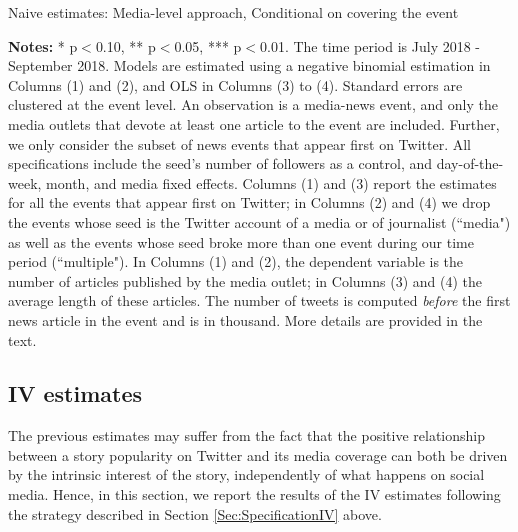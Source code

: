 \begin{table}
\caption{Naive estimates: Media-level approach, Conditional on covering the event}
\begin{center}
	
\end{center}
\begin{spacing}{0.5}
	{\fns \textbf{Notes:} * p$<$0.10, ** p$<$0.05, *** p$<$0.01. The time period is July 2018 - September 2018.  Models are estimated using a negative binomial estimation in Columns (1) and (2), and OLS in Columns (3) to (4). Standard errors are clustered at the event level. An observation is a media-news event, and only the media outlets that devote at least one article to the event are included. Further, we only consider the subset of news events that appear first on Twitter. All specifications include the seed's number of followers as a control, and day-of-the-week, month, and media fixed effects. Columns (1) and (3) report the estimates for all the events that appear first on Twitter; in Columns (2) and (4) we drop the events whose seed is the Twitter account of a media or of journalist (``media") as well as the events whose seed broke more than one event during our time period (``multiple"). In Columns (1) and (2), the dependent variable is the number of articles published by the media outlet; in Columns (3) and (4) the average length of these articles. The number of tweets is computed \textit{before} the first news article in the event and is in thousand. More details are provided in the text.}
\end{spacing}
\label{Tab:number_articles_negbinomial_Dcover_cevent}
\end{table} 



\subsection{IV estimates\label{Sec:ResultsIV}}

The previous estimates may suffer from the fact that the positive relationship between a story popularity on Twitter and its media coverage can both be driven by the intrinsic interest of the story, independently of what happens on social media. Hence, in this section, we report the results of the IV estimates following the strategy described in Section \ref{Sec:SpecificationIV} above.

